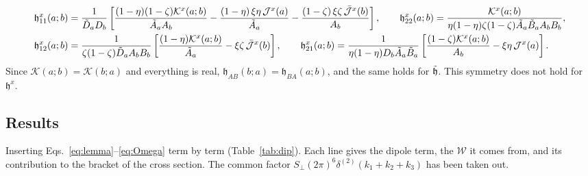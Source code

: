 \documentclass[9pt]{article}
\numberwithin{equation}{section}
\begin{document}
\begin{align}\label{eq:hx}
    \mathfrak{h}^{x}_{11}(a;b) & = \frac{1}{\Tilde{D}_{a}D_{b}}\left[\frac{(1-\eta)(1-\zeta)\mathcal{K}^{x}(a;b)}{\Tilde{A}_{a}A_{b}}-\frac{(1-\eta)\,\xi\eta\,\mathcal{J}^{x}(a)}{\Tilde{A}_{a}}-\frac{(1-\zeta)\,\xi\zeta\,\Bar{\mathcal{J}}^{x}(b)}{A_{b}}\right],\hspace{2em} \mathfrak{h}^{x}_{22}(a;b) = \frac{\mathcal{K}^{x}(a;b)}{\eta(1-\eta)\zeta(1-\zeta)\Tilde{A}_{a}\Tilde{B}_{a}A_{b}B_{b}},\notag \\
    \mathfrak{h}^{x}_{12}(a;b) & = \frac{1}{\zeta(1-\zeta)\Tilde{D}_{a}A_{b}B_{b}}\left[\frac{(1-\eta)\mathcal{K}^{x}(a;b)}{\Tilde{A}_{a}}-\xi\zeta\,\Bar{\mathcal{J}}^{x}(b)\right],\hspace{2em} \mathfrak{h}^{x}_{21}(a;b) = \frac{1}{\eta(1-\eta)D_{b}\Tilde{A}_{a}\Tilde{B}_{a}}\left[\frac{(1-\zeta)\mathcal{K}^{x}(a;b)}{A_{b}}-\xi\eta\,\mathcal{J}^{x}(a)\right].
\end{align}
Since $\mathcal{K}(a;b)=\mathcal{K}(b;a)$ and everything is real, $\mathfrak{h}_{AB}(b;a)=\mathfrak{h}_{BA}(a;b)$, and the same holds for $\Tilde{\mathfrak{h}}$. This symmetry does not hold for $\mathfrak{h}^{x}$.

\subsection{Results}
Inserting Eqs.~\eqref{eq:lemma}--\eqref{eq:Omega} term by term (Table~\ref{tab:dip}). Each line gives the dipole term, the $\mathcal{W}$ it comes from, and its contribution to the bracket of the cross section. The common factor $S_{\perp}(2\pi)^{6}\delta^{(2)}(k_{1}+k_{2}+k_{3})$ has been taken out.
\end{document}
